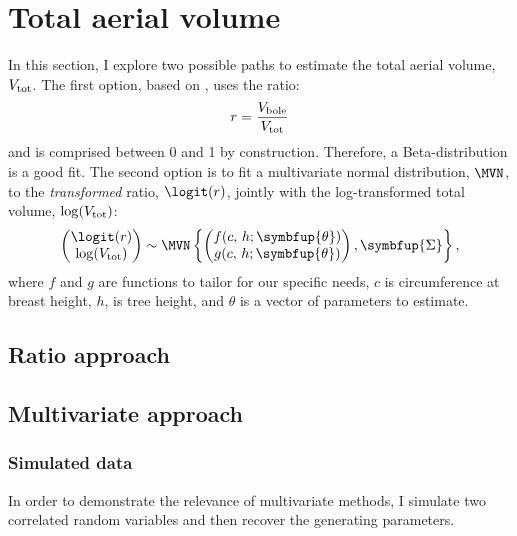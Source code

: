 \chapter{Total aerial volume\label{chap::total_v}}

In this section, I explore two possible paths to estimate the total aerial volume, \( V_{\text{tot}} \). The first option, based on \cite{Longuetaud2013}, uses the ratio:
\begin{equation}
	r = \frac{V_{\text{bole}}}{V_{\text{tot}}} \label{eq::r_boletot}
\end{equation}
and is comprised between 0 and 1 by construction. Therefore, a Beta-distribution is a good fit. The second option is to fit a multivariate normal distribution, \( \MVN \), to the \textit{transformed} ratio, \( \logit(r) \), jointly with the log-transformed total volume, \( \log(V_{\text{tot}}) \):
\begin{equation}
	\begin{pmatrix}
		\logit(r) \\
		\log(\Vtot)
	\end{pmatrix}
	\sim
	\MVN\left\{ \begin{pmatrix}
		f(c, \, h; \symbfup{\theta}) \\
		g(c, \, h; \symbfup{\theta}) \\
	\end{pmatrix}, \symbfup{\Sigma} \right\},
	\label{eq::mvn}
\end{equation}
where \( f \) and \( g \) are functions to tailor for our specific needs, \( c \) is circumference at breast height, \( h \), is tree height, and \( \theta \) is a vector of parameters to estimate.

\section{Ratio approach}

\section{Multivariate approach}

\subsection{Simulated data}
In order to demonstrate the relevance of multivariate methods, I simulate two correlated random variables and then recover the generating parameters.